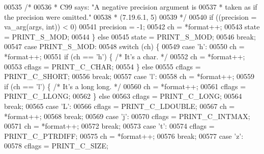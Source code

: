 \begin{DoxyCode}
{{00535                 \textcolor{comment}{/*}
00536 \textcolor{comment}{                 * C99 says: "A negative precision argument is}
00537 \textcolor{comment}{                 * taken as if the precision were omitted."}
00538 \textcolor{comment}{                 * (7.19.6.1, 5)}
00539 \textcolor{comment}{                 */}
00540                 \textcolor{keywordflow}{if} ((precision = va\_arg(args, \textcolor{keywordtype}{int})) < 0)
00541                     precision = -1;
00542                 ch = *format++;
00543                 state = PRINT\_S\_MOD;
00544             \} \textcolor{keywordflow}{else}
00545                 state = PRINT\_S\_MOD;
00546             \textcolor{keywordflow}{break};
00547         \textcolor{keywordflow}{case} PRINT\_S\_MOD:
00548             \textcolor{keywordflow}{switch} (ch) \{
00549             \textcolor{keywordflow}{case} \textcolor{charliteral}{'h'}:
00550                 ch = *format++;
00551                 \textcolor{keywordflow}{if} (ch == \textcolor{charliteral}{'h'}) \{    \textcolor{comment}{/* It's a char. */}
00552                     ch = *format++;
00553                     cflags = PRINT\_C\_CHAR;
00554                 \} \textcolor{keywordflow}{else}
00555                     cflags = PRINT\_C\_SHORT;
00556                 \textcolor{keywordflow}{break};
00557             \textcolor{keywordflow}{case} \textcolor{charliteral}{'l'}:
00558                 ch = *format++;
00559                 \textcolor{keywordflow}{if} (ch == \textcolor{charliteral}{'l'}) \{    \textcolor{comment}{/* It's a long long. */}
00560                     ch = *format++;
00561                     cflags = PRINT\_C\_LLONG;
00562                 \} \textcolor{keywordflow}{else}
00563                     cflags = PRINT\_C\_LONG;
00564                 \textcolor{keywordflow}{break};
00565             \textcolor{keywordflow}{case} \textcolor{charliteral}{'L'}:
00566                 cflags = PRINT\_C\_LDOUBLE;
00567                 ch = *format++;
00568                 \textcolor{keywordflow}{break};
00569             \textcolor{keywordflow}{case} \textcolor{charliteral}{'j'}:
00570                 cflags = PRINT\_C\_INTMAX;
00571                 ch = *format++;
00572                 \textcolor{keywordflow}{break};
00573             \textcolor{keywordflow}{case} \textcolor{charliteral}{'t'}:
00574                 cflags = PRINT\_C\_PTRDIFF;
00575                 ch = *format++;
00576                 \textcolor{keywordflow}{break};
00577             \textcolor{keywordflow}{case} \textcolor{charliteral}{'z'}:
00578                 cflags = PRINT\_C\_SIZE;
}}
\end{DoxyCode}
